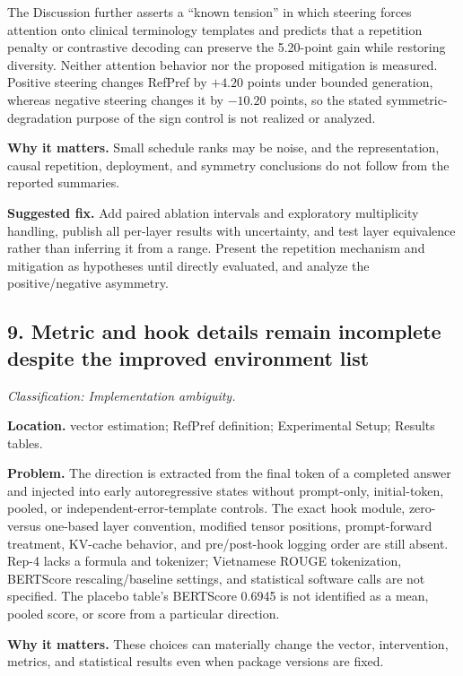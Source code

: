 \documentclass[11pt]{article}
\newcommand{\findinglabel}[1]{\textbf{#1}}
\newcommand{\classification}[1]{\textit{Classification: #1.}}
\begin{document}
The Discussion further asserts a ``known tension'' in which steering forces attention onto clinical terminology templates and predicts that a repetition penalty or contrastive decoding can preserve the 5.20-point gain while restoring diversity.  Neither attention behavior nor the proposed mitigation is measured.  Positive steering changes RefPref by $+4.20$ points under bounded generation, whereas negative steering changes it by $-10.20$ points, so the stated symmetric-degradation purpose of the sign control is not realized or analyzed.

\findinglabel{Why it matters.} Small schedule ranks may be noise, and the representation, causal repetition, deployment, and symmetry conclusions do not follow from the reported summaries.

\findinglabel{Suggested fix.} Add paired ablation intervals and exploratory multiplicity handling, publish all per-layer results with uncertainty, and test layer equivalence rather than inferring it from a range.  Present the repetition mechanism and mitigation as hypotheses until directly evaluated, and analyze the positive/negative asymmetry.

\subsection*{9. Metric and hook details remain incomplete despite the improved environment list}

\classification{Implementation ambiguity}

\findinglabel{Location.} vector estimation; RefPref definition; Experimental Setup; Results tables.

\findinglabel{Problem.} The direction is extracted from the final token of a completed answer and injected into early autoregressive states without prompt-only, initial-token, pooled, or independent-error-template controls.  The exact hook module, zero- versus one-based layer convention, modified tensor positions, prompt-forward treatment, KV-cache behavior, and pre/post-hook logging order are still absent.  Rep-4 lacks a formula and tokenizer; Vietnamese ROUGE tokenization, BERTScore rescaling/baseline settings, and statistical software calls are not specified.  The placebo table's BERTScore 0.6945 is not identified as a mean, pooled score, or score from a particular direction.

\findinglabel{Why it matters.} These choices can materially change the vector, intervention, metrics, and statistical results even when package versions are fixed.
\end{document}
